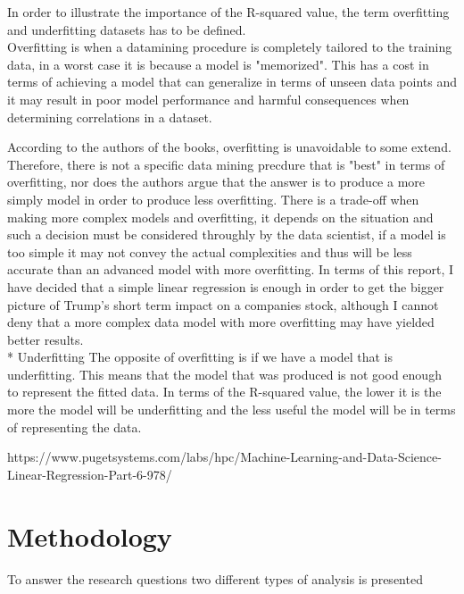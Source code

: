 \documentclass[11pt]{article}
\begin{document}
In order to illustrate the importance of the R-squared value, the term overfitting and underfitting  datasets has to be defined. \\

Overfitting is when a datamining procedure is completely tailored to the training data, in a worst case it is because a model is "memorized". This has a cost in terms of achieving a model that can generalize in terms of unseen data points and it may result in poor model performance and harmful consequences when determining correlations in a dataset. 

 According to the authors of the books, overfitting is unavoidable to some extend. Therefore, there is not a specific data mining precdure that is "best" in terms of overfitting, nor does the authors argue that the answer is to produce a more simply model in order to produce less overfitting. There is a trade-off when making more complex models and overfitting, it depends on the situation and such a decision must be considered throughly by the data scientist, if a model is too simple it may not convey the actual complexities and thus will be less accurate than an advanced model with more overfitting.
In terms of this report, I have decided that a simple linear regression is enough in order to get the bigger picture of Trump's short term impact on a companies stock, although I cannot deny that a more complex data model with more overfitting may have yielded better results. \\

* Underfitting
The opposite of overfitting is if we have a model that is underfitting. This means that the model that was produced is not good enough to represent the fitted data.  In terms of the R-squared value, the lower it is the more the model will be underfitting and the less useful the model will be in terms of representing the data.


https://www.pugetsystems.com/labs/hpc/Machine-Learning-and-Data-Science-Linear-Regression-Part-6-978/





\section{Methodology}
To answer the research questions two different types of analysis is presented\\
\end{document}
